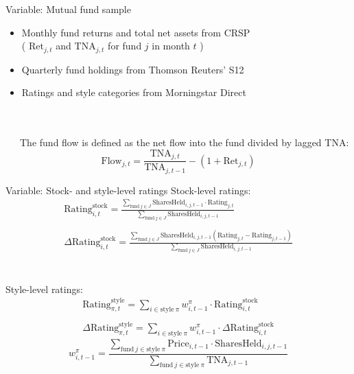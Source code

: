 \documentclass[UTF8, 16pt]{beamer}
\begin{document}
\begin{CJK*}{UTF8}{gbsn}
\begin{frame}{Variable: Mutual fund sample}
	\begin{itemize}
		\item Monthly fund returns and total net assets from CRSP \\ ( $\mathrm{Ret}_{j, t}$ and $\mathrm{TNA}_{j, t}$ for fund $j$ in month $t$ )
		\item Quarterly fund holdings from Thomson Reuters’ S12
		\item Ratings and style categories from Morningstar Direct
	\end{itemize}
	\\ \ \\
	\ \ \ The \alert{fund flow} is defined as the net flow into the fund divided by lagged TNA:
	$$
	\mathrm{Flow}_{j, t}=\frac{\mathrm{TNA}_{j, t}}{\mathrm{TNA}_{j, t-1}}-\left(1+\mathrm{Ret}_{j, t}\right)
	$$
\end{frame}

\begin{frame}{Variable: Stock- and style-level ratings}
	\alert{Stock}-level ratings:
	$$
	\begin{array}{c}
		\mathrm { Rating }_{i, t}^{\text{stock}}  =\frac{\sum_{\text {fund}\ j \in J} \mathrm{SharesHeld}_{i, j, t-1} \cdot \mathrm{Rating }_{j, t}}{\sum_{\text{fund}\ j\in J} \mathrm{SharesHeld}_{i, j, t-1}}
		\\ \ \\
	 	\Delta\mathrm{Rating}_{i, t}^{\text{stock}} =\frac{\sum_{\mathrm{fund}\ j \in J}\mathrm{SharesHeld}_{i, j, t-1}(\mathrm{Rating}_{j, t}-\text {Rating}_{j, t-1})}{\sum_{\text{fund}\ j\in J} \mathrm{SharesHeld}_{i, j, t-1}}
	 	\end{array}
	$$
	\\ \ \\
	\alert{Style}-level ratings:
	$$
	\begin{array}{c}
	\mathrm{ Rating }_{\pi, t}^{\text{style}}=\sum_{i \in \text{style}\ \pi} w_{i, t-1}^{\pi} \cdot \mathrm{Rating}_{i, t}^{\text{stock}}
	\\ \ \\
	\Delta\mathrm{Rating}_{\pi, t}^{\text{style}}=\sum_{i \in \text{style}\ \pi} w_{i, t-1}^{\pi} \cdot \Delta \mathrm{Rating}_{i, t}^{\text{stock}}
	\end{array}
	$$
	$$
	w_{i, t-1}^{\pi}=\frac{\sum_{\text{fund}\ j \in \text {style}\ \pi } \mathrm{Price}_{i, t-1} \cdot \mathrm{SharesHeld}_{i, j, t-1}}{\sum_{\text{fund}\ j \in \text{style}\ \pi} \mathrm{TNA}_{j, t-1}}
	$$
\end{frame}


\end{CJK*}
\end{document}

